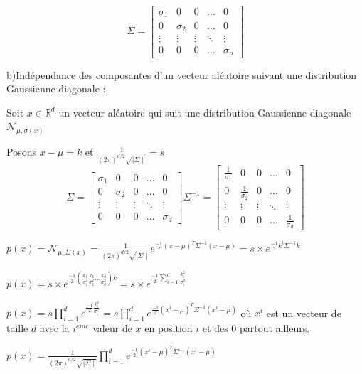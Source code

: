 \documentclass[a4paper,10pt]{article}
\begin{document}
\[
\Sigma =
\begin{bmatrix}
    \sigma_{1} & 0 & 0 & \dots  & 0 \\
    0 & \sigma_{2} & 0 & \dots  & 0 \\
    \vdots & \vdots & \vdots & \ddots & \vdots \\
    0 & 0 & 0 & \dots  & \sigma_{n}
\end{bmatrix}
\]

b)Indépendance des composantes d'un vecteur aléatoire suivant une distribution Gaussienne diagonale :

Soit $x \in \mathds{R}^{d}$ un vecteur aléatoire qui suit une distribution Gaussienne diagonale $\mathcal{N}_{\mu , \sigma(x)}$

Posons $x - \mu = k$ et $\frac{1}{(2 \pi)^{d/2} \sqrt{\mid{\Sigma} \mid}} = s$
\[
\Sigma =
\begin{bmatrix}
    \sigma_{1} & 0 & 0 & \dots  & 0 \\
    0 & \sigma_{2} & 0 & \dots  & 0 \\
    \vdots & \vdots & \vdots & \ddots & \vdots \\
    0 & 0 & 0 & \dots  & \sigma_{d}
\end{bmatrix}
\Sigma^{-1} =
\begin{bmatrix}
    \frac{1}{\sigma_{1}} & 0 & 0 & \dots  & 0 \\
    0 & \frac{1}{\sigma_{2}} & 0 & \dots  & 0 \\
    \vdots & \vdots & \vdots & \ddots & \vdots \\
    0 & 0 & 0 & \dots  & \frac{1}{\sigma_{d}}
\end{bmatrix}
\]

$p(x) = \mathcal{N}_{\mu , \Sigma(x)} = \frac{1}{(2 \pi)^{d/2} \sqrt{\mid{\Sigma} \mid}} e^{\frac{-1}{2} (x- \mu)^{T} \Sigma^{-1} (x- \mu) } = s \times e^{\frac{-1}{2} k^{t} \Sigma^{-1} k }$

$p(x) = s \times e^{\frac{-1}{2} (\frac{k_{1}}{\sigma_{1}^{2}} \frac{k_{2}}{\sigma_{2}^{2}} ... \frac{k_{d}}{\sigma_{d}^{2}} )k }  = s \times e^{\frac{-1}{2} \sum_{i=1}^{d} \frac{k_{i}^{2} }{\sigma_{i}^{2}} }$

$p(x) = s \prod_{i=1}^{d} e^{\frac{-1}{2} \frac{k_{i}^{2} }{\sigma_{i}^{2}} }  = s \prod_{i=1}^{d} e^{\frac{-1}{2} (x^{i} - \mu)^{T} \Sigma^{-1} (x^{i} - \mu) } $ où $x^{i}$ est un vecteur de taille $d$ avec la $i^{eme}$ valeur de $x$ en position $i$ et des 0 partout ailleurs.

$p(x) =\frac{1}{(2 \pi)^{d/2} \sqrt{\mid{\Sigma} \mid}} \prod_{i=1}^{d} e^{\frac{-1}{2} (x^{i} - \mu)^{T} \Sigma^{-1} (x^{i} - \mu) }  $
\end{document}
